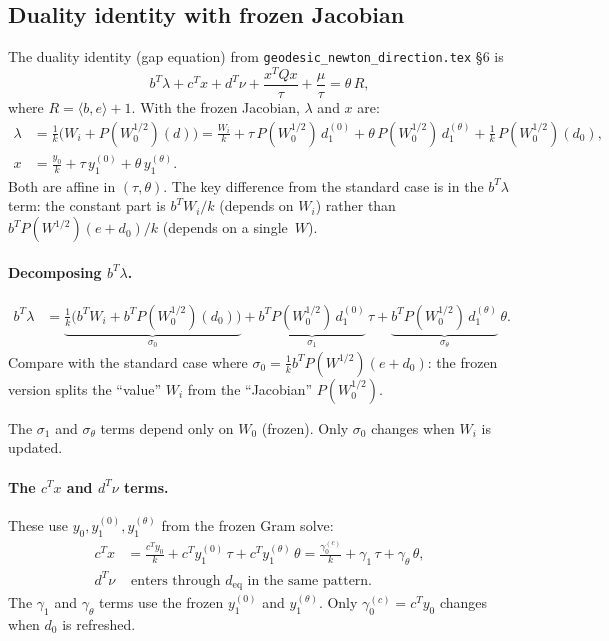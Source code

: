 \documentclass{article}
\begin{document}
\subsection{Duality identity with frozen Jacobian}

The duality identity (gap equation) from \texttt{geodesic\_newton\_direction.tex}
\S6 is
\begin{equation}\label{eq:gap-identity}
  b^T\lambda + c^Tx + d^T\nu + \frac{x^TQx}{\tau} + \frac{\mu}{\tau}
  = \theta\,R,
\end{equation}
where $R = \langle b, e\rangle + 1$.  With the frozen Jacobian, $\lambda$
and $x$ are:
\begin{align}
  \lambda &= \frac{1}{k}\bigl(W_i + P(W_0^{1/2})(d)\bigr)
    = \frac{W_i}{k}
      + \tau\,P(W_0^{1/2})\,d_1^{(0)}
      + \theta\,P(W_0^{1/2})\,d_1^{(\theta)}
      + \frac{1}{k}\,P(W_0^{1/2})(d_0), \\
  x &= \frac{y_0}{k} + \tau\,y_1^{(0)} + \theta\,y_1^{(\theta)}.
\end{align}
Both are affine in $(\tau, \theta)$.  The key difference from the standard
case is in the $b^T\lambda$ term: the constant part is $b^T W_i / k$
(depends on $W_i$) rather than $b^T P(W^{1/2})(e + d_0)/k$ (depends on
a single~$W$).

\paragraph{Decomposing $b^T\lambda$.}
\begin{align}
  b^T\lambda &= \underbrace{\frac{1}{k}\bigl(b^T W_i
    + b^T P(W_0^{1/2})(d_0)\bigr)}_{\sigma_0}
    + \underbrace{b^T P(W_0^{1/2})\,d_1^{(0)}}_{\sigma_1}\,\tau
    + \underbrace{b^T P(W_0^{1/2})\,d_1^{(\theta)}}_{\sigma_\theta}\,\theta.
    \label{eq:sigma-frozen}
\end{align}
Compare with the standard case where
$\sigma_0 = \frac{1}{k} b^T P(W^{1/2})(e + d_0)$:
the frozen version splits the ``value'' $W_i$ from the ``Jacobian''
$P(W_0^{1/2})$.

The $\sigma_1$ and $\sigma_\theta$ terms depend only on $W_0$ (frozen).
Only $\sigma_0$ changes when $W_i$ is updated.

\paragraph{The $c^Tx$ and $d^T\nu$ terms.}
These use $y_0, y_1^{(0)}, y_1^{(\theta)}$ from the frozen Gram solve:
\begin{align}
  c^Tx &= \frac{c^T y_0}{k} + c^T y_1^{(0)}\,\tau + c^T y_1^{(\theta)}\,\theta
         = \frac{\gamma_0^{(c)}}{k} + \gamma_1\,\tau + \gamma_\theta\,\theta, \\
  d^T\nu &\text{ enters through $d_{\text{eq}}$ in the same pattern.}
\end{align}
The $\gamma_1$ and $\gamma_\theta$ terms use the frozen $y_1^{(0)}$
and $y_1^{(\theta)}$.  Only $\gamma_0^{(c)} = c^T y_0$ changes when
$d_0$ is refreshed.
\end{document}

